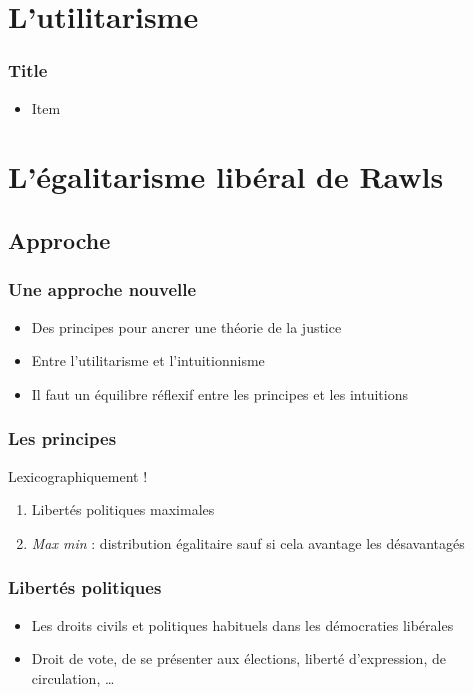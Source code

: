 \documentclass[french]{beamer}
\begin{document}
\section{L’utilitarisme}
\begin{frame}
	\frametitle{Title}
	\begin{itemize}
		\item Item
	\end{itemize}
\end{frame}

\section{L’égalitarisme libéral de Rawls}

\subsection{Approche}
\begin{frame}
	\frametitle{Une approche nouvelle}
	\begin{itemize}
		\item Des principes pour ancrer une théorie de la justice
		\item Entre l’utilitarisme et l’intuitionnisme
		\item Il faut un équilibre réflexif entre les principes et les intuitions
	\end{itemize}
\end{frame}

\begin{frame}
	\frametitle{Les principes}
  Lexicographiquement !
	\begin{enumerate}
		\item Libertés politiques maximales
		\item \emph{Max min} : distribution égalitaire sauf si cela avantage les désavantagés
	\end{enumerate}
\end{frame}

\begin{frame}
	\frametitle{Libertés politiques}
	\begin{itemize}
		\item Les droits civils et politiques habituels dans les démocraties libérales
		\item Droit de vote, de se présenter aux élections, liberté d’expression, de circulation, …
	\end{itemize}
\end{frame}
\end{document}
